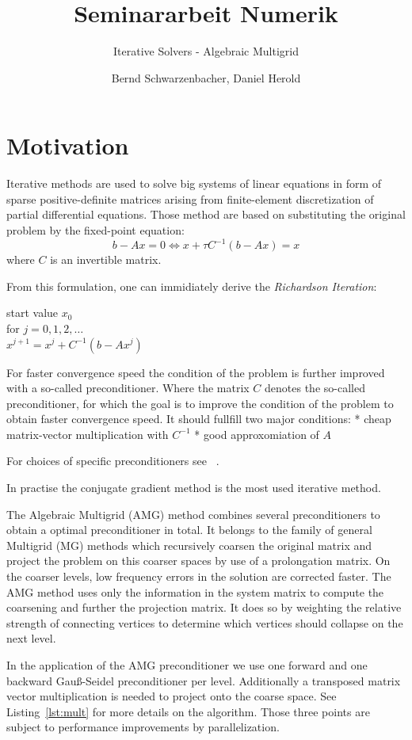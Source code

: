 \documentclass[a4paper,11pt]{scrartcl}
\title{Seminararbeit Numerik}
\subtitle{Iterative Solvers - Algebraic Multigrid}
\author{Bernd Schwarzenbacher, Daniel Herold}
\begin{document}
\maketitle
\tableofcontents
\pagebreak

\section{Motivation} \label{section:motiv}
Iterative methods are used to solve big systems of linear equations in form of
sparse positive-definite matrices arising from finite-element discretization of
partial differential equations.
Those method are based on substituting the original problem by the fixed-point
equation:
$$b-Ax = 0 \iff x + \tau C^{-1} (b-Ax) = x$$
where $C$ is an invertible matrix.

From this formulation, one can immidiately derive the
{\em Richardson Iteration}\/:

start value $x_{0}$ \\
for $j = 0, 1, 2, \dots$ \\
\quad $x^{j+1} = x^{j} + C^{-1} (b - Ax^{j})$

For faster convergence speed the condition of the problem is further improved
with a so-called preconditioner.
Where the matrix $C$ denotes the so-called preconditioner, for which the goal
is to improve the condition of the problem to obtain faster convergence speed.
It should fullfill two major conditions:
* cheap matrix-vector multiplication with $C^{-1}$
* good approxomiation of $A$

For choices of specific preconditioners see ~\label{section:gsm}.

In practise the conjugate gradient method is the most used iterative method.

The Algebraic Multigrid (AMG) method combines several preconditioners to
obtain a optimal preconditioner in total. It belongs to the family of general
Multigrid (MG) methods which recursively coarsen the original matrix and
project the problem on this coarser spaces by use of a prolongation matrix.
On the coarser levels, low frequency errors in the solution are corrected
faster. The AMG method uses only the information in the system matrix to
compute the coarsening and further the projection matrix. It does so by
weighting the relative strength of connecting vertices to determine which
vertices should collapse on the next level.
\cite{iterative} \cite{multigrid}

In the application of the AMG preconditioner we use one forward and one
backward Gauß-Seidel preconditioner per level. Additionally a
transposed matrix vector multiplication is needed to project onto the
coarse space. See Listing~\ref{lst:mult} for more details on the algorithm.
Those three points are subject to performance improvements by parallelization.
\end{document}
